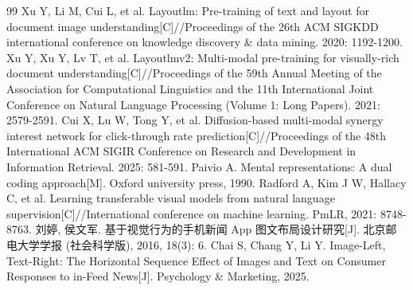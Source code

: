 \begin{thebibliography}{99}
 Xu Y, Li M, Cui L, et al. Layoutlm: Pre-training of text and layout for document image understanding[C]//Proceedings of the 26th ACM SIGKDD international conference on knowledge discovery \& data mining. 2020: 1192-1200.
 Xu Y, Xu Y, Lv T, et al. Layoutlmv2: Multi-modal pre-training for visually-rich document understanding[C]//Proceedings of the 59th Annual Meeting of the Association for Computational Linguistics and the 11th International Joint Conference on Natural Language Processing (Volume 1: Long Papers). 2021: 2579-2591.
 Cui X, Lu W, Tong Y, et al. Diffusion-based multi-modal synergy interest network for click-through rate prediction[C]//Proceedings of the 48th International ACM SIGIR Conference on Research and Development in Information Retrieval. 2025: 581-591.
 Paivio A. Mental representations: A dual coding approach[M]. Oxford university press, 1990.
 Radford A, Kim J W, Hallacy C, et al. Learning transferable visual models from natural language supervision[C]//International conference on machine learning. PmLR, 2021: 8748-8763.
 刘婷, 侯文军. 基于视觉行为的手机新闻 App 图文布局设计研究[J]. 北京邮电大学学报 (社会科学版), 2016, 18(3): 6.
 Chai S, Chang Y, Li Y. Image-Left, Text-Right: The Horizontal Sequence Effect of Images and Text on Consumer Responses to in-Feed News[J]. Psychology \& Marketing, 2025.
\end{thebibliography}
